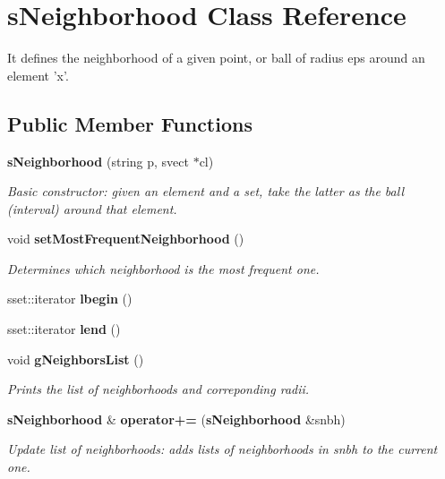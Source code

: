 \section{s\-Neighborhood Class Reference}
\label{classsNeighborhood}
It defines the neighborhood of a given point, or ball of radius eps around an element 'x'.  


\subsection*{Public Member Functions}
\begin{CompactItemize}
\item 
{\bf s\-Neighborhood} (string p, svect $\ast$cl)
\begin{CompactList}\small\item\em Basic constructor: given an element and a set, take the latter as the ball (interval) around that element. \item\end{CompactList}\item 
void {\bf set\-Most\-Frequent\-Neighborhood} ()
\begin{CompactList}\small\item\em Determines which neighborhood is the most frequent one. \item\end{CompactList}\item 
sset::iterator {\bf lbegin} ()\label{classsNeighborhood_a3}

\item 
sset::iterator {\bf lend} ()\label{classsNeighborhood_a4}

\item 
void {\bf g\-Neighbors\-List} ()\label{classsNeighborhood_a5}

\begin{CompactList}\small\item\em Prints the list of neighborhoods and correponding radii. \item\end{CompactList}\item 
{\bf s\-Neighborhood} \& {\bf operator+=} ({\bf s\-Neighborhood} \&snbh)
\begin{CompactList}\small\item\em Update list of neighborhoods: adds lists of neighborhoods in snbh to the current one. \item\end{CompactList}\end{CompactItemize}
